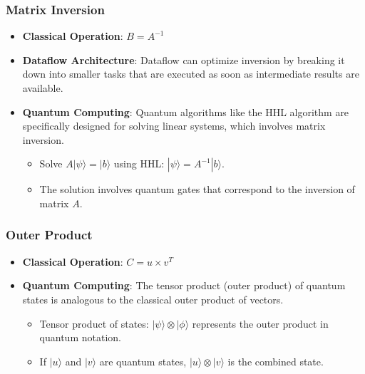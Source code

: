 \documentclass{article}
\begin{document}
\subsubsection{Matrix Inversion}
\begin{itemize}
    \item \textbf{Classical Operation}: \( B = A^{-1} \)
    \item \textbf{Dataflow Architecture}: Dataflow can optimize inversion by breaking it down into smaller tasks that are executed as soon as intermediate results are available.
    \item \textbf{Quantum Computing}: Quantum algorithms like the HHL algorithm are specifically designed for solving linear systems, which involves matrix inversion.
    \begin{itemize}
        \item Solve \( A|\psi\rangle = |b\rangle \) using HHL: \( |\psi\rangle = A^{-1}|b\rangle \).
        \item The solution involves quantum gates that correspond to the inversion of matrix \( A \).
    \end{itemize}
\end{itemize}

\subsubsection{Outer Product}
\begin{itemize}
    \item \textbf{Classical Operation}: \( C = u \times v^T \)
    \item \textbf{Quantum Computing}: The tensor product (outer product) of quantum states is analogous to the classical outer product of vectors.
    \begin{itemize}
        \item Tensor product of states: \( |\psi\rangle \otimes |\phi\rangle \) represents the outer product in quantum notation.
        \item If \( |u\rangle \) and \( |v\rangle \) are quantum states, \( |u\rangle \otimes |v\rangle \) is the combined state.
    \end{itemize}
\end{itemize}
\end{document}
